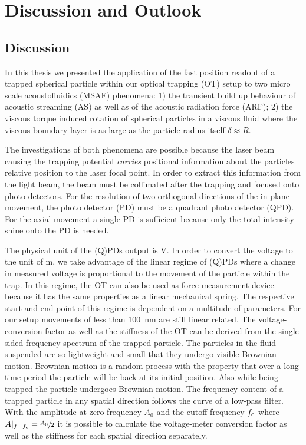 \chapter[Discussion \& Outlook]{Discussion and Outlook}\label{ch:discussion}

\section{Discussion}
In this thesis we presented the application of the fast position readout of a 
trapped spherical particle within our optical trapping (OT) setup to two micro 
scale acoustofluidics (MSAF) phenomena: 1) the transient build up behaviour of 
acoustic streaming (AS) as well as of the acoustic radiation force (ARF); 2) 
the viscous torque induced rotation of spherical particles in a viscous fluid 
where the viscous boundary layer is as large as the particle radius itself 
$\delta \approx R$.

The investigations of both phenomena are possible because the laser beam 
causing the trapping potential \emph{carries} positional information about the 
particles relative position to the laser focal point. In order to extract this 
information from the light beam, the beam must be collimated after the trapping 
and focused onto photo detectors. For the resolution of two orthogonal 
directions of the in-plane movement, the photo detector (PD) must be a quadrant 
photo detector (QPD). For the axial movement a single PD is sufficient because 
only the total intensity shine onto the PD is needed.

The physical unit of the (Q)PDs output is \si{\volt}. In order to convert the 
voltage to the unit of \si{\meter}, we take advantage of the linear regime of 
(Q)PDs where a change in measured voltage is proportional to the movement of 
the particle within the trap. In this regime, the OT can also be used as force 
measurement device because it has the same properties as a linear mechanical 
spring. The respective start and end point of this regime is dependent on a 
multitude of parameters. For our setup movements of less than \SI{100}{\nm} are 
still linear related. The voltage-conversion factor as well as the stiffness of 
the OT can be derived from the single-sided frequency spectrum of the trapped 
particle. The particles in the fluid suspended are so lightweight and small 
that they undergo visible Brownian motion. Brownian motion is a random process 
with the property that over a long time period the particle will be back at its 
initial position. Also while being trapped the particle undergoes Brownian 
motion. The frequency content of a trapped particle in any spatial direction 
follows the curve of a low-pass filter. With the amplitude at zero frequency 
$A_{0}$ and the cutoff frequency $f_{\mathrm{c}}$ where 
$A\vert_{f=f_{\mathrm{c}}}=\sfrac{A_{0}}{2}$ it is possible to calculate the 
voltage-meter conversion factor as well as the stiffness for each spatial 
direction separately.

